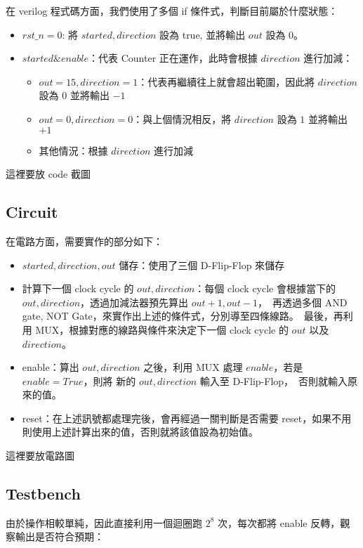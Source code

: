 \documentclass[10.5pt,compsoc,UTF8]{CjC}
\theoremstyle{mystyle}
\begin{document}
在 verilog 程式碼方面，我們使用了多個 if 條件式，判斷目前屬於什麼狀態：
\begin{itemize}
  \item $rst\_n = 0$: 將 $started, direction$ 設為 true, 並將輸出 $out$ 設為 $0$。
  \item $started \& enable$：代表 Counter 正在運作，此時會根據 $direction$ 進行加減：
  \begin{itemize}
    \item $out = 15, direction = 1$：代表再繼續往上就會超出範圍，因此將 $direction$ 設為 $0$ 並將輸出 $-1$
    \item $out = 0, direction = 0$：與上個情況相反，將 $direction$ 設為 $1$ 並將輸出 $+1$
    \item 其他情況：根據 $direction$ 進行加減
  \end{itemize}
\end{itemize}

這裡要放 code 截圖

\subsection{Circuit}

在電路方面，需要實作的部分如下：
\begin{itemize}
  \item $started, direction, out$ 儲存：使用了三個 D-Flip-Flop 來儲存
  \item 計算下一個 clock cycle 的 $out, direction$：每個 clock cycle 會根據當下的 $out, direction$，透過加減法器預先算出 $out + 1, out - 1$，\
  再透過多個 AND gate, NOT Gate，來實作出上述的條件式，分別導至四條線路。\
  最後，再利用 MUX，根據對應的線路與條件來決定下一個 clock cycle 的 $out$ 以及 $direction$。
  \item enable：算出 $out, direction$ 之後，利用 MUX 處理 $enable$，若是 $enable = True$，則將 新的 $out, direction$ 輸入至 D-Flip-Flop，\
  否則就輸入原來的值。
  \item reset：在上述訊號都處理完後，會再經過一關判斷是否需要 reset，如果不用則使用上述計算出來的值，否則就將該值設為初始值。
\end{itemize}

這裡要放電路圖

\subsection{Testbench}
由於操作相較單純，因此直接利用一個迴圈跑 $2^8$ 次，每次都將 enable 反轉，觀察輸出是否符合預期：
\end{document}
